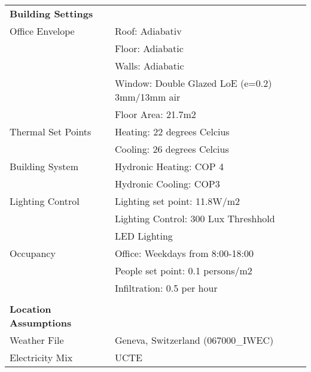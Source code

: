 \begin{table}[H]
\centering
\begin{tabular}{ll}

\textbf{Building Settings}    &                                                \\
Office Envelope               & Roof: Adiabativ                                \\
                              & Floor: Adiabatic                               \\
                              & Walls: Adiabatic                               \\
                              & Window: Double Glazed LoE (e=0.2) 3mm/13mm air \\
                              & Floor Area: 21.7m2                             \\
Thermal Set Points            & Heating: 22 degrees Celcius                    \\
                              & Cooling: 26 degrees Celcius                    \\
Building System               & Hydronic Heating: COP 4                        \\
                              & Hydronic Cooling: COP3                         \\
Lighting Control              & Lighting set point: 11.8W/m2                   \\
                              & Lighting Control: 300 Lux Threshhold           \\
                              & LED Lighting                                   \\
Occupancy                     & Office: Weekdays from 8:00-18:00               \\
                              & People set point: 0.1 persons/m2               \\
                              & Infiltration: 0.5 per hour                     \\
                              &                                                \\
\textbf{Location Assumptions} &                                                \\
Weather File                  & Geneva, Switzerland (067000_IWEC)              \\
Electricity Mix               & UCTE                                           \\

\end{tabular}
\end{table}
